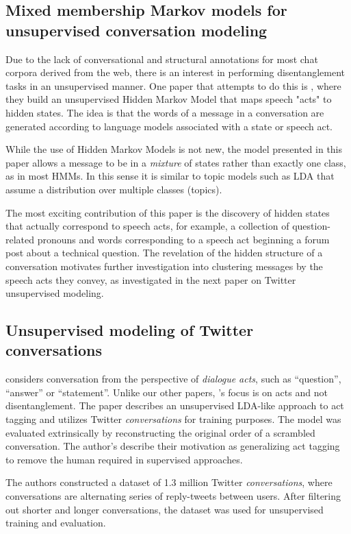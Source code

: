 \documentclass{article}
\begin{document}
\subsection{Mixed membership Markov models for unsupervised conversation
modeling} Due to the lack of conversational and structural annotations for most
chat corpora derived from the web, there is an interest in performing
disentanglement tasks in an unsupervised manner. One paper that attempts to do
this is \cite{Paul2012}, where they build an unsupervised Hidden Markov Model
that maps speech "acts" to hidden states. The idea is that the words of a
message in a conversation are generated according to language models associated
with a state or speech act. 

While the use of Hidden Markov Models is not new, the model presented in this
paper allows a message to be in a \emph{mixture} of states rather than exactly
one class, as in most HMMs. In this sense it is similar to topic models such as
LDA that assume a distribution over multiple classes (topics).

The most exciting contribution of this paper is the discovery of hidden states
that actually correspond to speech acts, for example, a collection of
question-related pronouns and words corresponding to a speech act beginning a
forum post about a technical question. The revelation of the hidden structure of
a conversation motivates further investigation into clustering messages by the
speech acts they convey, as investigated in the next paper on Twitter
unsupervised modeling.

\subsection{Unsupervised modeling of Twitter conversations}
\cite{Ritter2010a} considers conversation from the perspective of 
\textit{dialogue acts}, such as ``question'', ``answer'' or ``statement''. Unlike our other papers,
\cite{Ritter2010a}'s focus is on acts and not disentanglement. The paper describes
an unsupervised LDA-like approach to act tagging and utilizes Twitter \textit{conversations} for
training purposes. The model was evaluated extrinsically by reconstructing 
the original order of a scrambled conversation. The author's describe their motivation as
generalizing act tagging to remove the human required in supervised approaches. 

The authors constructed a dataset of 1.3 million Twitter \textit{conversations}, 
where conversations are alternating series of reply-tweets between users. After filtering out shorter 
and longer conversations, the dataset was used for unsupervised training and evaluation.
\end{document}
